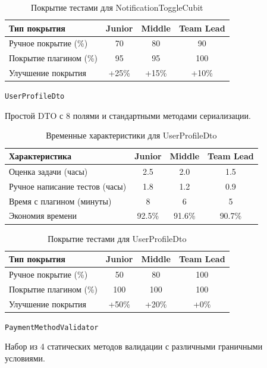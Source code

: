 \documentclass[14pt, russian]{scrartcl}
\begin{document}
\begin{table}[h!]
\centering
\begin{tabular}{|l|c|c|c|}
\hline
Тип покрытия & Junior & Middle & Team Lead \\
\hline
Ручное покрытие (\%) & 70 & 80 & 90 \\
Покрытие плагином (\%) & 95 & 95 & 100 \\
Улучшение покрытия & +25\% & +15\% & +10\% \\
\hline
\end{tabular}
\vspace{1ex}
\caption{Покрытие тестами для NotificationToggleCubit}
\end{table}

\texttt{UserProfileDto}

Простой DTO с 8 полями и стандартными методами сериализации.

\begin{table}[h!]
\centering
\begin{tabular}{|l|c|c|c|}
\hline
Характеристика & Junior & Middle & Team Lead \\
\hline
Оценка задачи (часы) & 2.5 & 2.0 & 1.5 \\
Ручное написание тестов (часы) & 1.8 & 1.2 & 0.9 \\
Время с плагином (минуты) & 8 & 6 & 5 \\
Экономия времени & 92.5\% & 91.6\% & 90.7\% \\
\hline
\end{tabular}
\vspace{1ex}
\caption{Временные характеристики для UserProfileDto}
\end{table}

\begin{table}[h!]
\centering
\begin{tabular}{|l|c|c|c|}
\hline
Тип покрытия & Junior & Middle & Team Lead \\
\hline
Ручное покрытие (\%) & 50 & 80 & 100 \\
Покрытие плагином (\%) & 100 & 100 & 100 \\
Улучшение покрытия & +50\% & +20\% & +0\% \\
\hline
\end{tabular}
\vspace{1ex}
\caption{Покрытие тестами для UserProfileDto}
\end{table}

\texttt{PaymentMethodValidator}

Набор из 4 статических методов валидации с различными граничными условиями.
\end{document}
